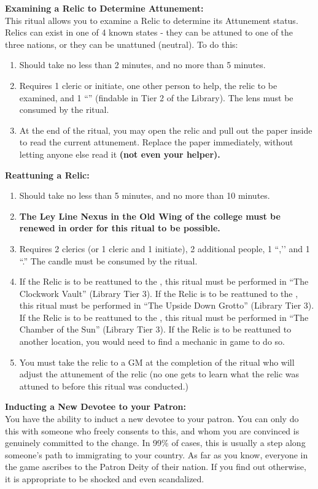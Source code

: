 \documentclass[green]{GL2020}
\begin{document}
\textbf{Examining a Relic to Determine Attunement:}\\
This ritual allows you to examine a Relic to determine its Attunement status. Relics can exist in one of 4 known states - they can be attuned to one of the three nations, or they can be unattuned (neutral). To do this:
  \begin{enumerate}
    \item Should take no less than 2 minutes, and no more than 5 minutes.
    \item Requires 1 cleric or initiate, one other person to help, the relic to be examined, and 1 ``\iCrystalLens{}'' (findable in Tier 2 of the Library). The lens must be consumed by the ritual. 
    \item At the end of the ritual, you may open the relic and pull out the paper inside to read the current attunement. Replace the paper immediately, without letting anyone else read it \textbf{(not even your helper).}
  \end{enumerate}
   
\textbf{Reattuning a Relic:}
\begin{enumerate}
    \item Should take no less than 5 minutes, and no more than 10 minutes.
    \item \textbf{The Ley Line Nexus in the Old Wing of the college must be renewed in order for this ritual to be possible.}
    \item Requires 2 clerics (or 1 cleric and 1 initiate), 2 additional people, 1 ``\iRitualCandle{},’’ and 1 ``\iTuningFork{}.'' The candle must be consumed by the ritual.
    \item If the Relic is to be reattuned to the \pTech{}, this ritual must be performed in “The Clockwork Vault” (Library Tier 3). If the Relic is to be reattuned to the \pShip{}, this ritual must be performed in “The Upside Down Grotto” (Library Tier 3). If the Relic is to be reattuned to the \pFarm{}, this ritual must be performed in “The Chamber of the Sun” (Library Tier 3). If the Relic is to be reattuned to another location, you would need to find a mechanic in game to do so.
    \item You must take the relic to a GM at the completion of the ritual who will adjust the attunement of the relic (no one gets to learn what the relic was attuned to before this ritual was conducted.)
  \end{enumerate}
   
\textbf{Inducting a New Devotee to your Patron:}\\
You have the ability to induct a new devotee to your patron. You can only do this with someone who freely consents to this, and whom you are convinced is genuinely committed to the change. In 99\% of cases, this is usually a step along someone’s path to immigrating to your country. As far as you know, everyone in the game ascribes to the Patron Deity of their nation. If you find out otherwise, it is appropriate to be shocked and even scandalized. 
\end{document}
